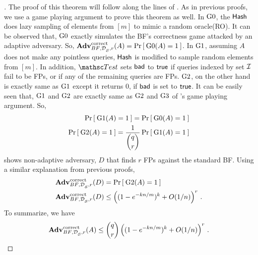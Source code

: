 \begin{proof}[]
The proof of this theorem will follow along the lines of . As in previous proofs, we use a game playing argument to prove this theorem as well. In $\text{G0}$, the $\mathsf{Hash}$ does lazy sampling of elements from $[m]$ to mimic a random oracle(RO). It can be observed that, $\text{G0}$ exactly simulates the BF's correctness game attacked by an adaptive adversary. So, $\mathrm{\mathbf{Adv}}^{\mathrm{correct}}_{{BF},\mathcal{D}_{{\cal S}}^{},r}(A) = \Pr\left[\: \text{G0}(A) = 1 \:\right]$.
%
In $\text{G1}$, assuming $A$ does not make any pointless queries, $\mathsf{Hash}$ is modified to sample random elements from $[m]$. In addition, $\Test$ sets $\mathsf{bad}$ to $\mathsf{true}$ if queries indexed by set ${\cal I}$ fail to be FPs, or if any of the remaining queries are FPs. $\text{G2}$, on the other hand is exactly same as $\text{G1}$ except it returns 0, if $\mathsf{bad}$ is set to $\mathsf{true}$. It can be easily seen that, $\text{G1}$ and $\text{G2}$ are exactly same as $\text{G2}$ and $\text{G3}$ of 's game playing argument. So, 
\begin{align*}
\Pr\left[\: \text{G1}(A)=1 \:\right] = \Pr\left[\: \text{G0}(A)=1 \:\right]\\
\Pr\left[\: \text{G2}(A)=1 \:\right] = \frac{1}{\dbinom{q}{r}}\Pr\left[\: \text{G1}(A)=1 \:\right]
\end{align*}
 shows non-adaptive adversary, $D$ that finds $r$ FPs against the standard BF. Using a similar explanation from previous proofs,
\begin{align*}
\mathrm{\mathbf{Adv}}^{\mathrm{correct}}_{{BF},\mathcal{D}_{{\cal S}}^{},r}(D) &= \Pr\left[\: \text{G2}(A) = 1 \:\right]\\
\mathrm{\mathbf{Adv}}^{\mathrm{correct}}_{{BF},\mathcal{D}_{{\cal S}}^{},r}(D) &\leq \left( (1-e^{-kn/m})^k + O(1/n) \right)^r \,.
\end{align*}
To summarize, we have
\[
\mathrm{\mathbf{Adv}}^{\mathrm{correct}}_{{BF},\mathcal{D}_{{\cal S}}^{},r}(A) \leq  {\dbinom{q}{r}} \left( (1-e^{-kn/m})^k + O(1/n) \right)^r\,.
\]


\end{proof}
